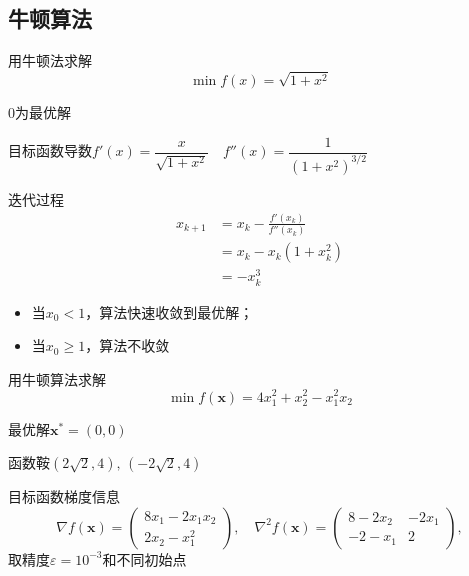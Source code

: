 \subsection{牛顿算法}
\begin{example}
    用牛顿法求解
    \[
        \min f(x)=\sqrt{1+x^2}
    \]
    \begin{solution}
        $0$为最优解
    
        目标函数导数$f'(x)=\dfrac{x}{\sqrt{1+x^2}}\quad f''(x)=\dfrac{1}{(1+x^2)^{3/2}}$
        
        迭代过程
        \[
            \begin{aligned}
                x_{k+1}& =x_{k}-\frac{f'(x_{k})}{f''(x_{k})}  \\
                &=x_{k}-x_{k}(1+x_{k}^{2}) \\
                &=-x_{k}^{3}
            \end{aligned}
        \]
        \begin{itemize}
            \item 当$x_0<1$，算法快速收敛到最优解；
            \item 当$x_0\geqslant 1$，算法不收敛
        \end{itemize}
    \end{solution}
\end{example}

\begin{example}
    用牛顿算法求解
    \[
        \min f(\boldsymbol{x}) = 4x_1^2+x_2^2-x_1^2x_2
    \]
    \begin{solution}
        最优解$\boldsymbol{x}^* = (0,0)$

        函数鞍$(2\sqrt{2},4),\,(-2\sqrt{2},4)$

        目标函数梯度信息
        \[
            \nabla f(\boldsymbol{x}) = \begin{pmatrix}
                8x_1-2x_1x_2\\2x_2-x_1^2
            \end{pmatrix},\quad
            \nabla^2 f(\boldsymbol{x}) = \begin{pmatrix}
                8-2x_2 & -2x_1 \\
                -2-x_1 & 2 
            \end{pmatrix},
        \]
        取精度$\varepsilon = 10^{-3}$和不同初始点
    \end{solution}
\end{example}
